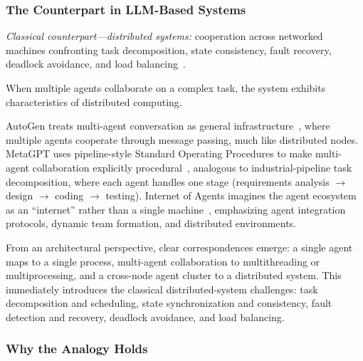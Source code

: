 \subsubsection{The Counterpart in LLM-Based Systems}

\textit{Classical counterpart---distributed systems:} cooperation across networked machines confronting task decomposition, state consistency, fault recovery, deadlock avoidance, and load balancing~\cite{hennessy2017quantitative}.

When multiple agents collaborate on a complex task, the system exhibits characteristics of distributed computing.

AutoGen treats multi-agent conversation as general infrastructure~\cite{wu2023autogen}, where multiple agents cooperate through message passing, much like distributed nodes.
MetaGPT uses pipeline-style Standard Operating Procedures to make multi-agent collaboration explicitly procedural~\cite{metagpt2023}, analogous to industrial-pipeline task decomposition, where each agent handles one stage (requirements analysis $\to$ design $\to$ coding $\to$ testing).
Internet of Agents imagines the agent ecosystem as an ``internet'' rather than a single machine~\cite{ioa2024}, emphasizing agent integration protocols, dynamic team formation, and distributed environments.

From an architectural perspective, clear correspondences emerge:
a single agent maps to a single process, multi-agent collaboration to multithreading or multiprocessing, and a cross-node agent cluster to a distributed system.
This immediately introduces the classical distributed-system challenges: task decomposition and scheduling, state synchronization and consistency, fault detection and recovery, deadlock avoidance, and load balancing.

\subsubsection{Why the Analogy Holds}


